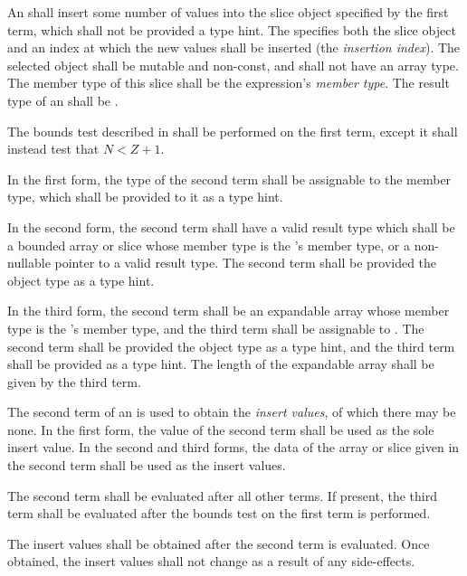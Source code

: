 \specsubsubitem
An  shall insert some number of values into the
slice object specified by the first term, which shall not be provided a type
hint. The  specifies both the slice object and
an index at which the new values shall be inserted (the \textit{insertion
index}). The selected object shall be mutable and non-const, and shall not have
an array type. The member type of this slice shall be the expression's
\textit{member type}. The result type of an 
shall be .

\specsubsubitem
The bounds test described in  shall be performed on the
first term, except it shall instead test that $N < Z+1$.

\specsubsubitem
In the first form, the type of the second term shall be assignable to the member
type, which shall be provided to it as a type hint.

\specsubsubitem
In the second form, the second term shall have a valid result type which
shall be a bounded array or slice whose member type is the
's member type, or a non-nullable pointer to a
valid result type. The second term shall be provided the object type as a type
hint.

\specsubsubitem
In the third form, the second term shall be an expandable array whose member
type is the 's member type, and the third term
shall be assignable to . The second term shall be provided the
object type as a type hint, and the third term shall be provided 
as a type hint. The length of the expandable array shall be given by the third
term.

\specsubsubitem
The second term of an  is used to obtain the
\textit{insert values}, of which there may be none. In the first form, the
value of the second term shall be used as the sole insert value. In the second
and third forms, the data of the array or slice given in the second term shall
be used as the insert values.

\specsubsubitem
The second term shall be evaluated after all other terms. If present, the third
term shall be evaluated after the bounds test on the first term is performed.

\specsubsubitem
The insert values shall be obtained after the second term is evaluated. Once
obtained, the insert values shall not change as a result of any side-effects.

